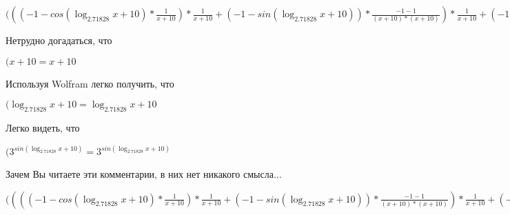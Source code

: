 \documentclass[12pt,a4paper,fleqn]{article}
\theoremstyle{definition}
\begin{document}
$((( -1  - cos(\log_{ 2.71828 }{ x  +  10 }) * \frac{ 1 }{ x  +  10 }
) * \frac{ 1 }{ x  +  10 }
 + ( -1  - sin(\log_{ 2.71828 }{ x  +  10 })) * \frac{ -1  -  1 }{( x  +  10 ) * ( x  +  10 )}
) * \frac{ 1 }{ x  +  10 }
 + ( -1  - sin(\log_{ 2.71828 }{ x  +  10 })) * \frac{ 1 }{ x  +  10 }
 * \frac{ -1  -  1 }{( x  +  10 ) * ( x  +  10 )}
 + ( -1  - sin(\log_{ 2.71828 }{ x  +  10 })) * \frac{ 1 }{ x  +  10 }
 * \frac{ -2 }{( x  +  10 ) * ( x  +  10 )}
 + cos(\log_{ 2.71828 }{ x  +  10 }) * \frac{ -1  -  -2  * ( x  +  10  +  x  +  10 )}{( x  +  10 ) * ( x  +  10 ) * ( x  +  10 ) * ( x  +  10 )}
 = (( -1  - cos(\log_{ 2.71828 }{ x  +  10 }) * \frac{ 1 }{ x  +  10 }
) * \frac{ 1 }{ x  +  10 }
 + ( -1  - sin(\log_{ 2.71828 }{ x  +  10 })) * \frac{ -1  -  1 }{( x  +  10 ) * ( x  +  10 )}
) * \frac{ 1 }{ x  +  10 }
 + ( -1  - sin(\log_{ 2.71828 }{ x  +  10 })) * \frac{ 1 }{ x  +  10 }
 * \frac{ -1  -  1 }{( x  +  10 ) * ( x  +  10 )}
 + ( -1  - sin(\log_{ 2.71828 }{ x  +  10 })) * \frac{ 1 }{ x  +  10 }
 * \frac{ -2 }{( x  +  10 ) * ( x  +  10 )}
 + cos(\log_{ 2.71828 }{ x  +  10 }) * \frac{ -1  -  -2  * ( x  +  10  +  x  +  10 )}{( x  +  10 ) * ( x  +  10 ) * ( x  +  10 ) * ( x  +  10 )}
$

Нетрудно догадаться, что

$( x  +  10  =  x  +  10 $

Используя Wolfram легко получить, что

$(\log_{ 2.71828 }{ x  +  10 } = \log_{ 2.71828 }{ x  +  10 }$

Легко видеть, что

$({ 3 }^{sin(\log_{ 2.71828 }{ x  +  10 })} = { 3 }^{sin(\log_{ 2.71828 }{ x  +  10 })}$

Зачем Вы читаете эти комментарии, в них нет никакого смысла...

$(((( -1  - cos(\log_{ 2.71828 }{ x  +  10 }) * \frac{ 1 }{ x  +  10 }
) * \frac{ 1 }{ x  +  10 }
 + ( -1  - sin(\log_{ 2.71828 }{ x  +  10 })) * \frac{ -1  -  1 }{( x  +  10 ) * ( x  +  10 )}
) * \frac{ 1 }{ x  +  10 }
 + ( -1  - sin(\log_{ 2.71828 }{ x  +  10 })) * \frac{ 1 }{ x  +  10 }
 * \frac{ -1  -  1 }{( x  +  10 ) * ( x  +  10 )}
 + ( -1  - sin(\log_{ 2.71828 }{ x  +  10 })) * \frac{ 1 }{ x  +  10 }
 * \frac{ -2 }{( x  +  10 ) * ( x  +  10 )}
 + cos(\log_{ 2.71828 }{ x  +  10 }) * \frac{ -1  -  -2  * ( x  +  10  +  x  +  10 )}{( x  +  10 ) * ( x  +  10 ) * ( x  +  10 ) * ( x  +  10 )}
) * { 3 }^{sin(\log_{ 2.71828 }{ x  +  10 })} = ((( -1  - cos(\log_{ 2.71828 }{ x  +  10 }) * \frac{ 1 }{ x  +  10 }
) * \frac{ 1 }{ x  +  10 }
 + ( -1  - sin(\log_{ 2.71828 }{ x  +  10 })) * \frac{ -1  -  1 }{( x  +  10 ) * ( x  +  10 )}
) * \frac{ 1 }{ x  +  10 }
 + ( -1  - sin(\log_{ 2.71828 }{ x  +  10 })) * \frac{ 1 }{ x  +  10 }
 * \frac{ -1  -  1 }{( x  +  10 ) * ( x  +  10 )}
 + ( -1  - sin(\log_{ 2.71828 }{ x  +  10 })) * \frac{ 1 }{ x  +  10 }
 * \frac{ -2 }{( x  +  10 ) * ( x  +  10 )}
 + cos(\log_{ 2.71828 }{ x  +  10 }) * \frac{ -1  -  -2  * ( x  +  10  +  x  +  10 )}{( x  +  10 ) * ( x  +  10 ) * ( x  +  10 ) * ( x  +  10 )}
) * { 3 }^{sin(\log_{ 2.71828 }{ x  +  10 })}$
\end{document}

